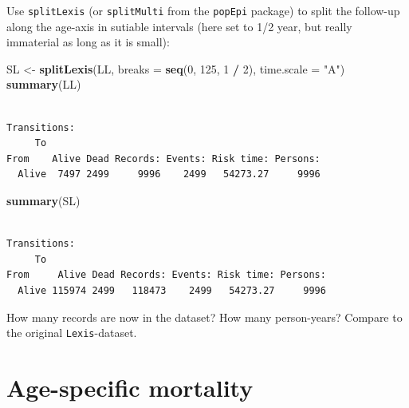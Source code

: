 \documentclass[
]{book}
\newenvironment{Shaded}{\begin{snugshade}}{\end{snugshade}}
\newcommand{\AttributeTok}[1]{\textcolor[rgb]{0.13,0.29,0.53}{#1}}
\newcommand{\DecValTok}[1]{\textcolor[rgb]{0.00,0.00,0.81}{#1}}
\newcommand{\FunctionTok}[1]{\textcolor[rgb]{0.13,0.29,0.53}{\textbf{#1}}}
\newcommand{\NormalTok}[1]{#1}
\newcommand{\OtherTok}[1]{\textcolor[rgb]{0.56,0.35,0.01}{#1}}
\newcommand{\SpecialCharTok}[1]{\textcolor[rgb]{0.81,0.36,0.00}{\textbf{#1}}}
\newcommand{\StringTok}[1]{\textcolor[rgb]{0.31,0.60,0.02}{#1}}
\theoremstyle{definition}
\theoremstyle{definition}
\theoremstyle{definition}
\theoremstyle{definition}
\theoremstyle{remark}
\begin{document}
\begin{enumerate}
  Use \texttt{splitLexis} (or \texttt{splitMulti} from the
  \texttt{popEpi} package) to split the follow-up along the
  age-axis in sutiable intervals (here set to 1/2 year, but really
  immaterial as long as it is small):

\begin{Shaded}
\begin{Highlighting}[]
\NormalTok{SL }\OtherTok{\textless{}{-}} \FunctionTok{splitLexis}\NormalTok{(LL,}
                 \AttributeTok{breaks =} \FunctionTok{seq}\NormalTok{(}\DecValTok{0}\NormalTok{, }\DecValTok{125}\NormalTok{, }\DecValTok{1} \SpecialCharTok{/} \DecValTok{2}\NormalTok{),}
             \AttributeTok{time.scale =} \StringTok{"A"}\NormalTok{)}
\FunctionTok{summary}\NormalTok{(LL)}
\end{Highlighting}
\end{Shaded}

\begin{verbatim}

Transitions:
     To
From    Alive Dead Records: Events: Risk time: Persons:
  Alive  7497 2499     9996    2499   54273.27     9996
\end{verbatim}

\begin{Shaded}
\begin{Highlighting}[]
\FunctionTok{summary}\NormalTok{(SL)}
\end{Highlighting}
\end{Shaded}

\begin{verbatim}

Transitions:
     To
From     Alive Dead Records: Events: Risk time: Persons:
  Alive 115974 2499   118473    2499   54273.27     9996
\end{verbatim}

  How many records are now in the dataset? How many person-years?
  Compare to the original \texttt{Lexis}-dataset.
\end{enumerate}

\section{Age-specific mortality}\label{age-specific-mortality}
\end{document}
